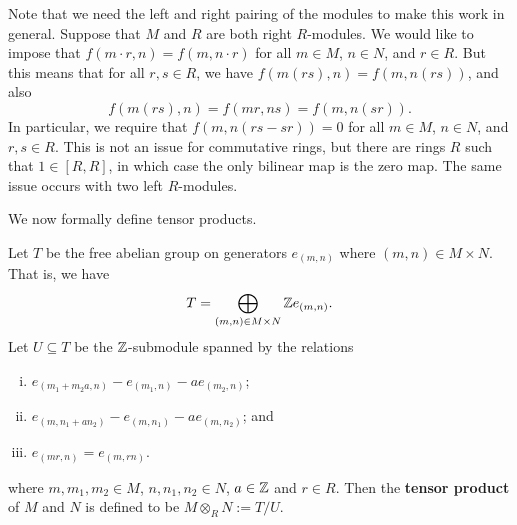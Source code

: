 \begin{remark}{}
    Note that we need the left and right pairing of the modules to make this work 
    in general. Suppose that $M$ and $R$ are both right $R$-modules. We would like 
    to impose that $f(m \cdot r, n) = f(m, n \cdot r)$ for all $m \in M$, $n \in N$, and 
    $r \in R$. But this means that for all $r, s \in R$, we have $f(m(rs), n) 
    = f(m, n(rs))$, and also 
    \[ f(m(rs), n) = f(mr, ns) = f(m, n(sr)). \] 
    In particular, we require that $f(m, n(rs - sr)) = 0$ for all $m \in M$, 
    $n \in N$, and $r, s \in R$. This is not an issue for commutative rings, 
    but there are rings $R$ such that $1 \in [R, R]$, in which case the only 
    bilinear map is the zero map. The same issue occurs with two left $R$-modules. 
\end{remark}

We now formally define tensor products. 

\begin{defn}{}
    Let $T$ be the free abelian group on generators $e_{(m,n)}$ where $(m, n) 
    \in M \times N$. That is, we have 
    \[ T = \bigoplus_{(m, n) \in M \times N} \mathbb{Z} e_{(m,n)}. \] 
    Let $U \subseteq T$ be the $\mathbb{Z}$-submodule spanned by the relations 
    \begin{enumerate}[(i)]
        \item $e_{(m_1 + m_2a, n)} - e_{(m_1, n)} - ae_{(m_2, n)}$; 
        \item $e_{(m, n_1 + an_2)} - e_{(m, n_1)} - ae_{(m, n_2)}$; and 
        \item $e_{(mr, n)} = e_{(m, rn)}$. 
    \end{enumerate}
    where $m, m_1, m_2 \in M$, $n, n_1, n_2 \in N$, $a \in \mathbb{Z}$ and $r \in R$. 
    Then the {\bf tensor product} of $M$ and $N$ is defined to be 
    $M \otimes_R N := T/U$. 
\end{defn}